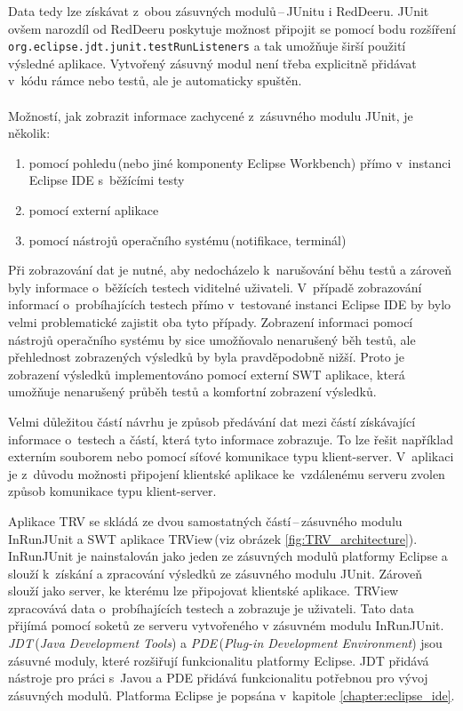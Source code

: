   Data tedy lze získávat z~obou zásuvných modulů\,--\,JUnitu i RedDeeru. JUnit ovšem narozdíl od RedDeeru poskytuje možnost připojit se pomocí bodu rozšíření\\\texttt{org.eclipse.jdt.junit.testRunListeners} a tak umožňuje širší použití výsledné aplikace. Vytvořený zásuvný modul není třeba explicitně přidávat v~kódu rámce nebo testů, ale je automaticky spuštěn.
  \\
  \\
  \noindent
  Možností, jak zobrazit informace zachycené z~zásuvného modulu JUnit, je několik:
  \begin{enumerate}
   \item pomocí pohledu\,(nebo jiné komponenty Eclipse Workbench) přímo v~instanci Eclipse IDE s~běžícími testy
   \item pomocí externí aplikace
   \item pomocí nástrojů operačního systému\,(notifikace, terminál)
  \end{enumerate}

  Při zobrazování dat je nutné, aby nedocházelo k~narušování běhu testů a zároveň byly informace o~běžících testech viditelné uživateli. V~případě zobrazování informací o~probíhajících testech přímo v~testované instanci Eclipse IDE by bylo velmi problematické zajistit oba tyto případy. Zobrazení informaci pomocí nástrojů operačního systému by sice umožňovalo nenarušený běh testů, ale přehlednost zobrazených výsledků by byla pravděpodobně nižší. Proto je zobrazení výsledků implementováno pomocí externí SWT aplikace, která umožňuje nenarušený průběh testů a komfortní zobrazení výsledků.

  Velmi důležitou částí návrhu je způsob předávání dat mezi částí získávající informace o~testech a částí, která tyto informace zobrazuje. To lze řešit například externím souborem nebo pomocí síťové komunikace typu klient-server. V~aplikaci je z~důvodu možnosti připojení klientské aplikace ke~vzdálenému serveru zvolen způsob komunikace typu klient-server.

  Aplikace TRV se skládá ze dvou samostatných částí\,--\,zásuvného modulu InRunJUnit a SWT aplikace TRView\,(viz obrázek \ref{fig:TRV_architecture}). InRunJUnit je nainstalován jako jeden ze zásuvných modulů platformy Eclipse a slouží k~získání a zpracování výsledků ze zásuvného modulu JUnit. Zároveň slouží jako server, ke kterému lze připojovat klientské aplikace. TRView zpracovává data o~probíhajících testech a zobrazuje je uživateli. Tato data přijímá pomocí soketů ze serveru vytvořeného v zásuvném modulu InRunJUnit. \emph{JDT}\,(\emph{Java Development Tools}) a \emph{PDE}\,(\emph{Plug-in Development Environment}) jsou zásuvné moduly, které rozšiřují funkcionalitu platformy Eclipse. JDT přidává nástroje pro práci s~Javou a PDE přidává funkcionalitu potřebnou pro vývoj zásuvných modulů. Platforma Eclipse je popsána v~kapitole \ref{chapter:eclipse_ide}.

